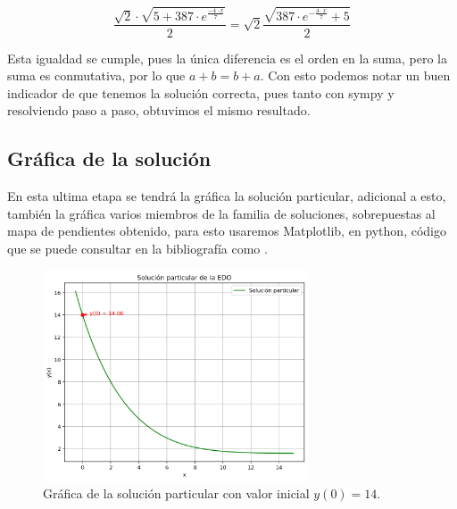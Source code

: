 \documentclass{article}
\begin{document}
\[
 \frac{\sqrt{2}\cdot\sqrt{5+387\cdot e^{\frac{-4\cdot x}{7}}}}{2}=\sqrt{2}\frac{\sqrt{387\cdot e^{-\frac{4\cdot x}{7}}+5}}{2}
\]

Esta igualdad se cumple, pues la única diferencia es el orden en la suma, pero la suma es conmutativa, por lo que \(a+b=b+a\).
Con esto podemos notar un buen indicador de que tenemos la solución correcta, pues tanto con sympy y resolviendo paso a paso, obtuvimos el mismo resultado.

\subsection{Gráfica de la solución}

En esta ultima etapa se tendrá la gráfica la solución particular, adicional a esto, también la gráfica varios miembros de la familia de soluciones, sobrepuestas al mapa de pendientes obtenido, para esto usaremos Matplotlib, en python, código que se puede consultar en la bibliografía como \cite{codigo_mapaPendiente}.

\begin{figure}[H]
    \centering
    \includegraphics[width=0.7\textwidth]{Grafica_solucionP.png}
    \caption{Gráfica de la solución particular con valor inicial \( y(0) = 14 \).}
    \label{fig:sol_particular}
\end{figure}
\end{document}
